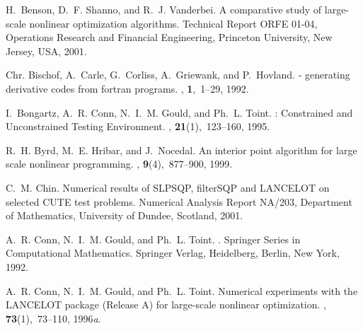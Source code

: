 \documentclass[twoside]{article}
\begin{document}
%
%
\begin{thebibliography}{xx}

H.~Benson, D.~F. Shanno, and R.~J. Vanderbei.
\newblock A comparative study of large-scale nonlinear optimization algorithms.
\newblock Technical Report ORFE 01-04, Operations Research and Financial
  Engineering, Princeton University, New Jersey, USA, 2001.

Chr. Bischof, A.~Carle, G.~Corliss, A.~Griewank, and P.~Hovland.
 - generating derivative codes from fortran programs.
, {\bf 1},~1--29, 1992.

I.~Bongartz, A.~R. Conn, N.~I.~M. Gould, and Ph.~L. Toint.
: {C}onstrained and {U}nconstrained {T}esting
  {E}nvironment.
, {\bf
  21}(1),~123--160, 1995.

R.~H. Byrd, M.~E. Hribar, and J.~Nocedal.
\newblock An interior point algorithm for large scale nonlinear programming.
, {\bf 9}(4),~877--900, 1999.

C.~M. Chin.
\newblock Numerical results of {SLPSQP}, filter{SQP} and {LANCELOT} on selected
  {CUTE} test problems.
\newblock Numerical Analysis Report NA/203, Department of Mathematics,
  University of Dundee, Scotland, 2001.

A.~R. Conn, N.~I.~M. Gould, and Ph.~L. Toint.
.
\newblock Springer Series in Computational Mathematics. Springer Verlag,
  Heidelberg, Berlin, New York, 1992.

A.~R. Conn, N.~I.~M. Gould, and Ph.~L. Toint.
\newblock Numerical experiments with the {{\sf LANCELOT}} package ({R}elease
  {A}) for large-scale nonlinear optimization.
, {\bf 73}(1),~73--110,
  1996{\em a}.


\end{thebibliography}
\end{document}
